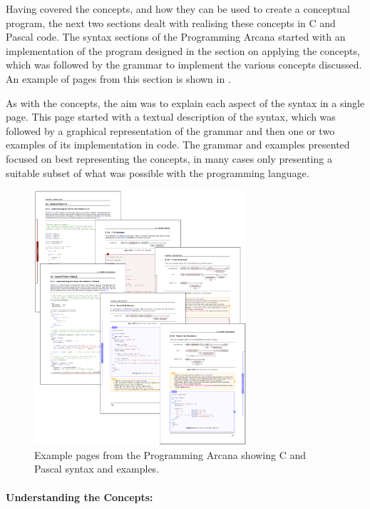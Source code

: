 Having covered the concepts, and how they can be used to create a conceptual program, the next two sections dealt with realising these concepts in C and Pascal code. The syntax sections of the Programming Arcana started with an implementation of the program designed in the section on applying the concepts, which was followed by the grammar to implement the various concepts discussed. An example of pages from this section is shown in .

As with the concepts, the aim was to explain each aspect of the syntax in a single page. This page started with a textual description of the syntax, which was followed by a graphical representation of the grammar and then one or two examples of its implementation in code. The grammar and examples presented focused on best representing the concepts, in many cases only presenting a suitable subset of what was possible with the programming language. 

\begin{figure}[h]
  \centering
  \includegraphics[width=0.7\textwidth]{ArcanaSyntax}
  \caption{Example pages from the Programming Arcana showing C and Pascal syntax and examples.}
  \label{fig:arcana_syntax}
\end{figure}


\clearpage

\paragraph{Understanding the Concepts:} %
\label{par:understanding_the_concepts_}

